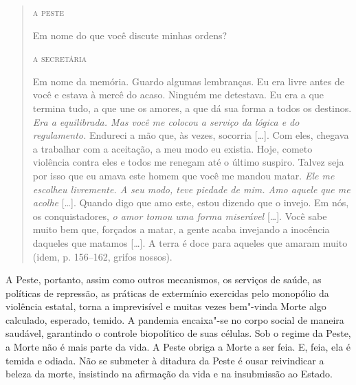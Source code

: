\begin{quote}
\textsc{a peste}

Em nome do que você discute minhas ordens?

\textsc{a secretária}

Em nome da memória. Guardo algumas lembranças. Eu era livre antes de
você e estava à mercê do acaso. Ninguém me detestava. Eu era a que
termina tudo, a que une os amores, a que dá sua forma a todos os
destinos. \textit{Era a equilibrada. Mas você me colocou a serviço da
lógica e do regulamento.} Endureci a mão que, às vezes, socorria
{[}\ldots{}{]}. Com eles, chegava a trabalhar com a aceitação, a meu modo eu
existia. Hoje, cometo violência contra eles e todos me renegam até o
último suspiro. Talvez seja por isso que eu amava este homem que você me
mandou matar. \textit{Ele me escolheu livremente. A seu modo, teve
piedade de mim. Amo aquele que me acolhe} {[}\ldots{}{]}. Quando digo que amo
este, estou dizendo que o invejo. Em nós, os conquistadores, \textit{o
amor tomou uma forma miserável} {[}\ldots{}{]}. Você sabe muito bem que,
forçados a matar, a gente acaba invejando a inocência daqueles que
matamos {[}\ldots{}{]}. A terra é doce para aqueles que amaram muito (idem,
p. 156--162, grifos nossos).
\end{quote}

A Peste, portanto, assim como outros mecanismos, os serviços de saúde,
as políticas de repressão, as práticas de extermínio exercidas pelo
monopólio da violência estatal, torna a imprevisível e muitas vezes
bem"-vinda Morte algo calculado, esperado, temido. A pandemia encaixa"-se
no corpo social de maneira saudável, garantindo o controle biopolítico
de suas células. Sob o regime da Peste, a Morte não é mais parte da
vida. A Peste obriga a Morte a ser feia. E, feia, ela é temida e odiada.
Não se submeter à ditadura da Peste é ousar reivindicar a beleza da
morte, insistindo na afirmação da vida e na insubmissão ao Estado.

